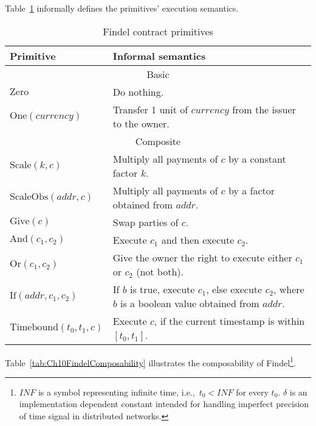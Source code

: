 Table~\ref{tab:Ch10FindelSemantics} informally defines the primitives' execution semantics.

\begin{table}[ht]
	\centering
	\begin{tabular}{|p{0.25\linewidth}|p{0.75\linewidth}|}
		\hline
		\textbf{Primitive} & \textbf{Informal semantics} \\
		\hline\hline
		\multicolumn{2}{|c|}{Basic}\\
		\hline
		\(\mathrm{Zero}\) & Do nothing. \\
		\hline
		\(\mathrm{One} (currency)\) & Transfer 1 unit of \(currency\) from the issuer to the owner. \\
		\hline\hline
		\multicolumn{2}{|c|}{Composite}\\
		\hline
		\(\mathrm{Scale} (k, c)\) & Multiply all payments of \(c\) by a constant factor \(k\). \\
		\hline
		\(\mathrm{ScaleObs} (addr, c)\) & Multiply all payments of \(c\) by a factor obtained from \(addr\). \\
		\hline
		\(\mathrm{Give} (c)\) & Swap parties of \(c\). \\
		\hline
		\(\mathrm{And} (c_1, c_2)\) & Execute \(c_1\) and then execute \(c_2\). \\
		\hline
		\(\mathrm{Or} (c_1, c_2)\) & Give the owner the right to execute either \(c_1\) or \(c_2\) (not both). \\
		\hline
		\(\mathrm{If} (addr, c_1, c_2)\) & If \(b\) is true, execute \(c_1\), else execute \(c_2\), where \(b\) is a boolean value obtained from \(addr\). \\
		\hline
		\(\mathrm{Timebound} (t_0, t_1, c)\) & Execute \(c\), if the current timestamp is within \([t_0, t_1]\). \\
		\hline
	\end{tabular}
	\caption{Findel contract primitives}
	\label{tab:Ch10FindelSemantics}
\end{table}

Table~\ref{tab:Ch10FindelComposability} illustrates the composability of Findel\footnote{$INF$ is a symbol representing infinite time, i.e.,~$t_0 < INF$ for every $t_0$. $\delta$ is an implementation dependent constant intended for handling imperfect precision of time signal in distributed networks.}.


